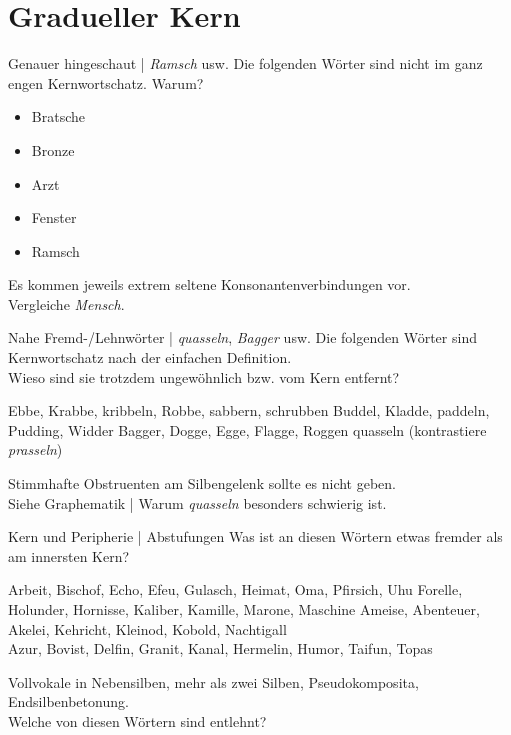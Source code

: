 \section{Gradueller Kern}

\begin{frame}
  {Genauer hingeschaut | \textit{Ramsch} usw.}
  \onslide<+->
  \onslide<+->
  Die folgenden Wörter sind nicht im ganz engen Kernwortschatz. Warum?\\
  \Zeile
  \begin{itemize}[<+->]
    \item Bratsche
    \item Bronze
    \item Arzt
    \item Fenster
    \item Ramsch
  \end{itemize}
  \onslide<+->
  \Zeile
  Es kommen jeweils \alert{extrem seltene Konsonantenverbindungen} vor.\\
  \onslide<+->
  Vergleiche \alert{\textit{Mensch}}.
\end{frame}

\begin{frame}
  {Nahe Fremd-\slash Lehnwörter | \textit{quasseln}, \textit{Bagger} usw.}
  \onslide<+->
  \onslide<+->
  Die folgenden Wörter sind Kernwortschatz nach der einfachen Definition.\\
  Wieso sind sie trotzdem ungewöhnlich bzw. vom Kern entfernt?\\
  \Zeile
  \onslide<+->
  \begin{exe}
    \ex Ebbe, Krabbe, kribbeln, Robbe, sabbern, schrubben
    \ex Buddel, Kladde, paddeln, Pudding, Widder
    \ex Bagger, Dogge, Egge, Flagge, Roggen
    \Halbzeile
    \ex quasseln (kontrastiere \textit{prasseln})
  \end{exe}
  \onslide<+->
  \Zeile
  \alert{Stimmhafte Obstruenten am Silbengelenk} sollte es nicht geben.\\
  Siehe Graphematik | Warum \textit{quasseln} besonders schwierig ist.
\end{frame}

\begin{frame}
  {Kern und Peripherie | Abstufungen}
  \onslide<+->
  \onslide<+->
  Was ist an diesen Wörtern etwas fremder als am innersten Kern?\\
  \Halbzeile
  \begin{exe}
    \ex Arbeit, Bischof, Echo, Efeu, Gulasch, Heimat, Oma, Pfirsich, Uhu
    \onslide<+->
    \ex Forelle, Holunder, Hornisse, Kaliber, Kamille, Marone, Maschine
    \onslide<+->
    \ex Ameise, Abenteuer, Akelei, Kehricht, Kleinod, Kobold, Nachtigall\\
    \onslide<+->
    \ex Azur, Bovist, Delfin, Granit, Kanal, Hermelin, Humor, Taifun, Topas
  \end{exe}
  \onslide<+->
  \Zeile
  \alert{Vollvokale} in Nebensilben, \alert{mehr als zwei Silben}, \alert{Pseudokomposita}, \alert{Endsilbenbetonung}.\\
  \Halbzeile
  \onslide<+->
  Welche von diesen Wörtern sind entlehnt?
\end{frame}

